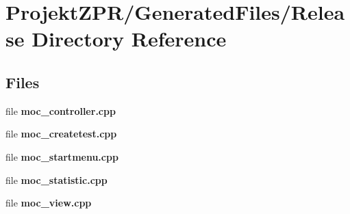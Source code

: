 \section{Projekt\-Z\-P\-R/\-Generated\-Files/\-Release Directory Reference}
\label{dir_c52b942d8b3f55e02a9bf1f2ed4ce952}
\subsection*{Files}
\begin{DoxyCompactItemize}
\item 
file {\bf moc\-\_\-controller.\-cpp}
\item 
file {\bf moc\-\_\-createtest.\-cpp}
\item 
file {\bf moc\-\_\-startmenu.\-cpp}
\item 
file {\bf moc\-\_\-statistic.\-cpp}
\item 
file {\bf moc\-\_\-view.\-cpp}
\end{DoxyCompactItemize}

